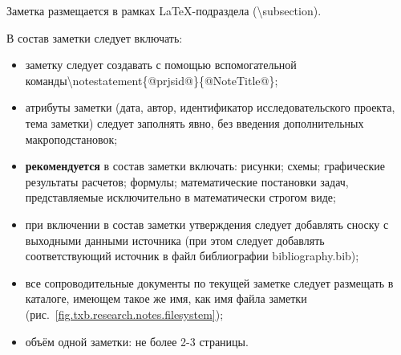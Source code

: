 \def\notedate{2021.09.19}
\def\currentauthor{Соколов А.П. (РК6)}

Заметка размещается в рамках \LaTeX-подраздела (\textsf{\textbackslash subsection}).

В состав заметки следует включать:
\begin{itemize}
	\item заметку следует создавать с помощью вспомогательной команды\newline \textsf{\textbackslash notestatement\{@prjsid@\}\{@NoteTitle@\}};
	\item атрибуты заметки (дата, автор, идентификатор исследовательского проекта, тема заметки) следует заполнять явно, без введения дополнительных макроподстановок;
	\item \textbf{рекомендуется} в состав заметки включать: рисунки; схемы; графические результаты расчетов; формулы; математические постановки задач, представляемые исключительно в математически строгом виде;
	\item при включении в состав заметки утверждения следует добавлять сноску с выходными данными источника (при этом следует добавлять соответствующий источник в файл библиографии \textsf{bibliography.bib});
	\item все сопроводительные документы по текущей заметке следует размещать в каталоге, имеющем такое же имя, как имя файла заметки (рис.~\ref{fig.txb.research.notes.filesystem});
	\item объём одной заметки: не более 2-3 страницы.
\end{itemize}

